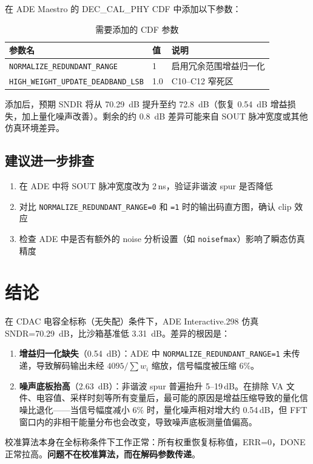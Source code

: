 \documentclass[12pt,a4paper]{article}
\begin{document}
在 ADE Maestro 的 DEC\_CAL\_PHY CDF 中添加以下参数：

\begin{table}[H]
\centering
\caption{需要添加的 CDF 参数}
\label{tab:cdf_fix}
\begin{tabular}{lll}
\toprule
参数名 & 值 & 说明 \\
\midrule
\texttt{NORMALIZE\_REDUNDANT\_RANGE} & 1 & 启用冗余范围增益归一化 \\
\texttt{HIGH\_WEIGHT\_UPDATE\_DEADBAND\_LSB} & 1.0 & C10--C12 窄死区 \\
\bottomrule
\end{tabular}
\end{table}

添加后，预期 SNDR 将从 \SI{70.29}{dB} 提升至约 \SI{72.8}{dB}（恢复 \SI{0.54}{dB} 增益损失，加上量化噪声改善）。剩余的约 \SI{0.8}{dB} 差异可能来自 SOUT 脉冲宽度或其他仿真环境差异。

\subsection{建议进一步排查}

\begin{enumerate}
\item 在 ADE 中将 SOUT 脉冲宽度改为 2\,ns，验证非谐波 spur 是否降低
\item 对比 \texttt{NORMALIZE\_REDUNDANT\_RANGE=0} 和 \texttt{=1} 时的输出码直方图，确认 clip 效应
\item 检查 ADE 中是否有额外的 noise 分析设置（如 \texttt{noisefmax}）影响了瞬态仿真精度
\end{enumerate}

\section{结论}

在 CDAC 电容全标称（无失配）条件下，ADE Interactive.298 仿真 SNDR=\SI{70.29}{dB}，比沙箱基准低 \SI{3.31}{dB}。差异的根因是：

\begin{enumerate}
\item \textbf{增益归一化缺失}（\SI{0.54}{dB}）：ADE 中 \texttt{NORMALIZE\_REDUNDANT\_RANGE=1} 未传递，导致解码输出未经 $4095/\sum w_i$ 缩放，信号幅度被压缩 6\%。

\item \textbf{噪声底板抬高}（\SI{2.63}{dB}）：非谐波 spur 普遍抬升 5--19\,dB。在排除 VA 文件、电容值、采样时刻等所有变量后，最可能的原因是增益压缩导致的量化信噪比退化——当信号幅度减小 6\% 时，量化噪声相对增大约 0.54\,dB，但 FFT 窗口内的非相干能量分布也会改变，导致噪声底板测量值偏高。
\end{enumerate}

校准算法本身在全标称条件下工作正常：所有权重恢复标称值，ERR=0，DONE 正常拉高。\textbf{问题不在校准算法，而在解码参数传递}。
\end{document}
